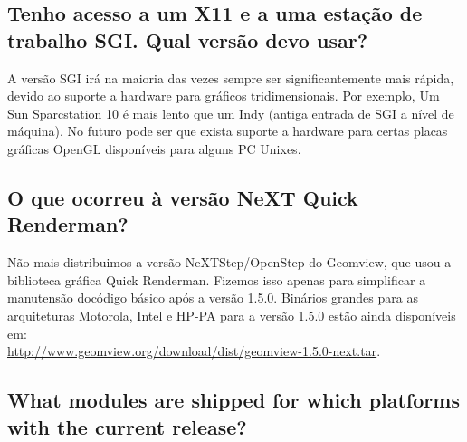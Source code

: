 \documentclass[12pt,a4paper]{article}
\begin{document}
    \subsection{Tenho acesso a um X11 e a uma esta\c{c}\~ao de trabalho SGI. Qual vers\~ao devo usar?}

        A vers\~ao SGI ir\'a na maioria das vezes sempre ser significantemente mais r\'apida, devido ao
        suporte a hardware para gr\'aficos tridimensionais. Por exemplo, Um Sun Sparcstation 10 \'e
        mais lento que um Indy (antiga entrada de SGI a n\'ivel de m\'aquina). No futuro pode
        ser que exista suporte a hardware para certas placas gr\'aficas OpenGL dispon\'iveis para
        alguns PC Unixes.

    \subsection{O que ocorreu \`a vers\~ao NeXT Quick Renderman?}

        N\~ao mais distribuimos a vers\~ao NeXTStep/OpenStep do Geomview, que
        usou a biblioteca gr\'afica Quick Renderman. Fizemos isso apenas para simplificar
        a manutens\~ao doc\'{o}digo b\'asico ap\'{o}s a vers\~ao 1.5.0. Bin\'arios grandes para as arquiteturas
        Motorola, Intel e HP-PA para a vers\~ao 1.5.0 est\~ao ainda dispon\'iveis em:\\
        \url{http://www.geomview.org/download/dist/geomview-1.5.0-next.tar}.

    \subsection{What modules are shipped for which platforms with the current release?}
\end{document}
